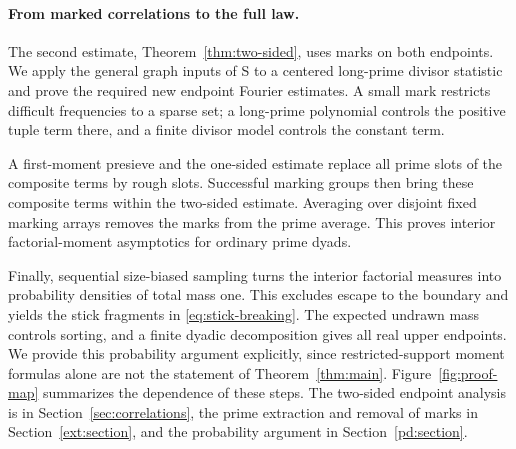\paragraph{From marked correlations to the full law.}
The second estimate, Theorem~\ref{thm:two-sided}, uses marks on
both endpoints.  We apply the general graph inputs of S to a
centered long-prime divisor statistic and prove the required new
endpoint Fourier estimates.  A small mark restricts difficult
frequencies to a sparse set; a long-prime polynomial controls the
positive tuple term there, and a finite divisor model controls
the constant term.

A first-moment presieve and the one-sided estimate replace all
prime slots of the composite terms by rough slots.  Successful
marking groups then bring these composite terms within the
two-sided estimate.  Averaging over disjoint fixed marking arrays
removes the marks from the prime average.  This proves interior
factorial-moment asymptotics for ordinary prime dyads.

Finally, sequential size-biased sampling turns the interior
factorial measures into probability densities of total mass one.
This excludes escape to the boundary and yields the stick fragments
in \eqref{eq:stick-breaking}.  The expected undrawn mass controls
sorting, and a finite dyadic decomposition gives all real upper
endpoints.  We provide this probability argument explicitly, since
restricted-support moment formulas alone are not the statement of
Theorem~\ref{thm:main}.
Figure~\ref{fig:proof-map} summarizes the dependence of these steps.
The two-sided endpoint analysis is in Section~\ref{sec:correlations},
the prime extraction and removal of marks in Section~\ref{ext:section},
and the probability argument in Section~\ref{pd:section}.

